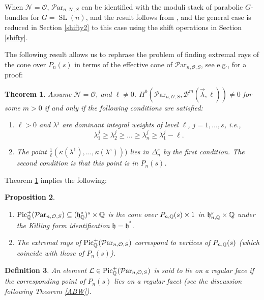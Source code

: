 \documentclass[11pt]{amsart}
\newcommand\op{\operatorname}
\newcommand\frh{\mathfrak{h}}
\newcommand\Pic{\operatorname{Pic}}
\newcommand\ml{\mathcal{L}}
\newcommand\mn{\mathcal{N}}
\newcommand\Par{\mathcal{P}\text{ar} }
\newtheorem{theorem}{Theorem}[section]
\newtheorem{remark}[theorem]{ Remark}
\newtheorem{proposition}[theorem]{Proposition}
\newtheorem{defi}[theorem]{Definition}
\numberwithin{theorem}{subsection}
\begin{document}
When $\mathcal{N}=\mathcal{O}$, $\Par_{n,\mn,S}$ can be identified with the moduli stack of parabolic $G$-bundles for $G=\op{SL}(n)$, and the result follows from \cite{LS}, and the general case is reduced in Section \ref{shifty2} to this case using the shift operations in Section \ref{shifty}.


The following result allows us to rephrase the problem of finding extremal rays of the cone over $P_n(s)$ in terms of the effective cone of $\Par_{n,\mathcal{O},S}$, see e.g., \cite[Theorem 5.2]{BKq} for a proof:
\begin{theorem}\label{blacktea}
Assume $\mn=\mathcal{O}$, and $\ell\neq 0$.
$H^0(\Par_{n,\mathcal{O},S},\mathcal{B}^m(\vec{\lambda},\ell))\neq 0$
for some $m>0$ if and only if the following conditions are satisfied:
\begin{enumerate}
\item $\ell>0$ and $\lambda^j$ are dominant integral weights  of level $\ell$, $j=1,\dots,s$, i.e.,
\begin{equation}\label{weyl}
\lambda^{j}_1\geq \lambda^{j}_2\geq \dots\geq \lambda^{j}_n\geq \lambda^{j}_1-\ell.
\end{equation}
\item The point $\frac{1}{\ell}(\kappa(\lambda^1),\dots,\kappa(\lambda^s)))$ lies in $\Delta_n^s$ by the first condition.
The second condition is that this point is in $P_n(s)$.
\end{enumerate}
\end{theorem}

Theorem \ref{blacktea} implies the following:
\begin{proposition}\label{b9}
\hspace{2em}
\begin{enumerate}
\item $\Pic^+_{\Bbb{Q}}(\Par_{n,\mathcal{O},S})\subseteq (\frh_{\Bbb{Q}}^*)^s\times\Bbb{Q}$ is the cone over $P_{n,\Bbb{Q}}(s)\times 1$ in $\frh^s_{n,\Bbb{Q}}\times \Bbb{Q}$ under the Killing form identification $\frh=\frh^*$.
\item
The extremal rays of $\Pic^+_{\Bbb{Q}}(\Par_{n,\mathcal{O},S})$ correspond to vertices of $P_{n,\Bbb{Q}}(s)$ (which coincide with those of $P_{n}(s)$).
\end{enumerate}
\end{proposition}
\begin{defi}
An element $\ml\in \Pic^+_{\Bbb{Q}}(\Par_{n,\mathcal{O},S})$ is said to lie on a regular face if the corresponding point of  $P_{n}(s)$ lies on a regular facet (see the discussion following Theorem \ref{ABW}).
\end{defi}
\end{document}
